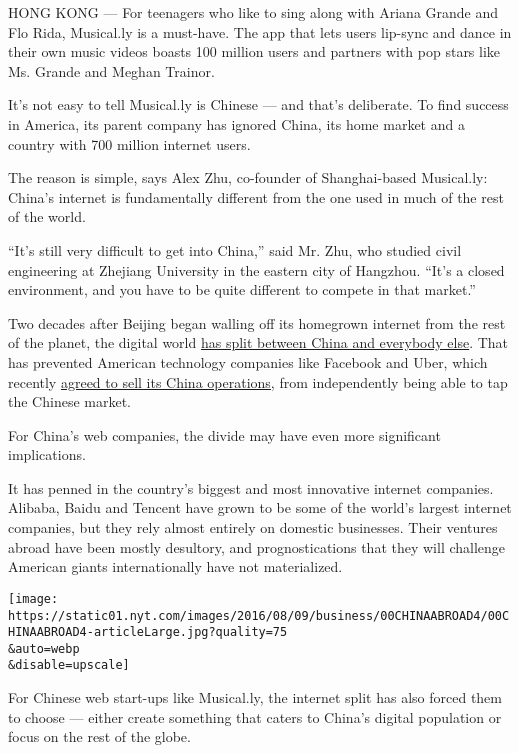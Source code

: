 HONG KONG --- For teenagers who like to sing along with Ariana Grande
and Flo Rida, Musical.ly is a must-have. The app that lets users
lip-sync and dance in their own music videos boasts 100 million users
and partners with pop stars like Ms. Grande and Meghan Trainor.

It's not easy to tell Musical.ly is Chinese --- and that's deliberate.
To find success in America, its parent company has ignored China, its
home market and a country with 700 million internet users.

The reason is simple, says Alex Zhu, co-founder of Shanghai-based
Musical.ly: China's internet is fundamentally different from the one
used in much of the rest of the world.

``It's still very difficult to get into China,'' said Mr. Zhu, who
studied civil engineering at Zhejiang University in the eastern city of
Hangzhou. ``It's a closed environment, and you have to be quite
different to compete in that market.''

Two decades after Beijing began walling off its homegrown internet from
the rest of the planet, the digital world
\href{http://www.nytimes.com/2016/08/02/technology/uber-china-internet.html}{has
split between China and everybody else}. That has prevented American
technology companies like Facebook and Uber, which recently
\href{http://www.nytimes.com/2016/08/02/business/dealbook/china-uber-didi-chuxing.html?hpw\&rref=technology\&action=click\&pgtype=Homepage\&module=well-region\&region=bottom-well\&WT.nav=bottom-well}{agreed
to sell its China operations}, from independently being able to tap the
Chinese market.

For China's web companies, the divide may have even more significant
implications.

It has penned in the country's biggest and most innovative internet
companies. Alibaba, Baidu and Tencent have grown to be some of the
world's largest internet companies, but they rely almost entirely on
domestic businesses. Their ventures abroad have been mostly desultory,
and prognostications that they will challenge American giants
internationally have not materialized.

\texttt{[image: https://static01.nyt.com/images/2016/08/09/business/00CHINAABROAD4/00CHINAABROAD4-articleLarge.jpg?quality=75\\\&auto=webp\\\&disable=upscale]}

For Chinese web start-ups like Musical.ly, the internet split has also
forced them to choose --- either create something that caters to China's
digital population or focus on the rest of the globe.

